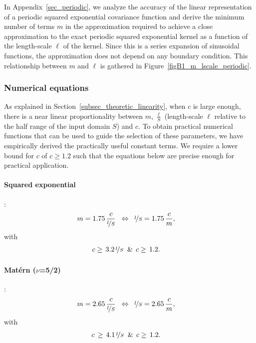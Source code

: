 In Appendix~\ref{sec_periodic}, we analyze the accuracy of the linear representation of a periodic squared exponential covariance function and derive the minimum number of terms $m$ in the approximation required to achieve a close approximation to the exact periodic squared exponential kernel as a function of the length-scale $\ell$ of the kernel. Since this is a series expansion of sinusoidal functions, the approximation does not depend on any boundary condition. This relationship between $m$ and $\ell$ is gathered in Figure~\ref{figB1_m_lscale_periodic}.


\subsubsection{Numerical equations}
\label{sec_num_equations}

As explained in Section~\ref{subsec_theoretic_linearity}, when $c$ is large enough, there is a near linear proportionality between $m$, $\frac{\ell}{S}$ (length-scale $\ell$ relative to the half range of the input domain $S$) and $c$. To obtain practical numerical functions that can be used to guide the selection of these parameters, we have empirically derived the practically useful constant terms. We require a lower bound for $c$ of $c \geq 1.2$ such that the equations below are precise enough for practical application.


\paragraph*{Squared exponential}:
%
\begin{align}\label{eq_m_l_QE}
&m= 1.75 \, \frac{c}{\nicefrac{l}{S}} \;\; \Leftrightarrow \;\; \nicefrac{l}{S}= 1.75 \, \frac{c}{m},
\end{align}
%
with
%
\begin{align}\label{eq_c_vs_l_QE}
&c \geq \, 3.2 \, \nicefrac{l}{S} \;\; \& \;\, c \geq \, 1.2 .
\end{align}

\paragraph*{Mat\'ern ($\nu$=5/2)}:
%
\begin{align}\label{eq_m_l_mat52}
&m= 2.65 \, \frac{c}{\nicefrac{l}{S}} \;\; \Leftrightarrow \;\; \nicefrac{l}{S}= 2.65 \, \frac{c}{m},
\end{align}
%
with
%
\begin{align}\label{eq_c_vs_l_mat52}
&c \, \geq \, 4.1 \, \nicefrac{l}{S} \;\; \& \;\, c \geq \, 1.2 .
\end{align}

